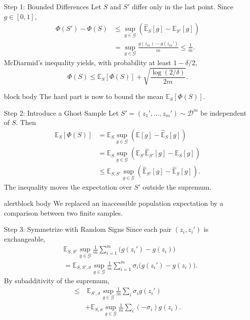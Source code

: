 \documentclass[aspectratio=169,10pt]{beamer}
\newcommand{\D}{\mathcal{D}}
\newcommand{\Gc}{\mathcal{G}}
\newcommand{\E}{\mathbb{E}}
\newcommand{\KeyBox}[1]{%
  \begin{beamercolorbox}[rounded=true,sep=0.22cm,wd=\linewidth]{block body}
    #1
  \end{beamercolorbox}%
}
\newcommand{\OrangeBox}[1]{%
  \begin{beamercolorbox}[rounded=true,sep=0.22cm,wd=\linewidth]{alertblock body}
    #1
  \end{beamercolorbox}%
}
\begin{document}
\begin{frame}[t]{Step 1: Bounded Differences}
  \vspace{0.01cm}
  Let $S$ and $S'$ differ only in the last point. Since $g\in[0,1]$,
  \begin{align*}
    \Phi(S')-\Phi(S)
    &\le \sup_{g\in\Gc}
      \left(\widehat{\E}_S[g]-\widehat{\E}_{S'}[g]\right)\\
    &=\sup_{g\in\Gc}\frac{g(z_m)-g(z_m')}{m}
    \le \frac1m.
  \end{align*}
  McDiarmid's inequality yields, with probability at least $1-\delta/2$,
  \[
    \Phi(S)
    \le \E_S[\Phi(S)]
    +\sqrt{\frac{\log(2/\delta)}{2m}}.
  \]
  \vspace{0.05cm}
  \KeyBox{The hard part is now to bound the mean $\E_S[\Phi(S)]$.}
\end{frame}

\begin{frame}[t]{Step 2: Introduce a Ghost Sample}
  \vspace{0.01cm}
  Let $S'=(z_1',\ldots,z_m')\sim\D^m$ be independent of $S$. Then
  \begin{align*}
    \E_S[\Phi(S)]
    &=\E_S\sup_{g\in\Gc}\left(\E[g]-\widehat{\E}_S[g]\right)\\
    &=\E_S\sup_{g\in\Gc}
      \left(\E_{S'}\widehat{\E}_{S'}[g]-\widehat{\E}_S[g]\right)\\
    &\le \E_{S,S'}\sup_{g\in\Gc}
      \left(\widehat{\E}_{S'}[g]-\widehat{\E}_S[g]\right).
  \end{align*}
  The inequality moves the expectation over $S'$ outside the supremum.
  \vspace{0.08cm}
  \OrangeBox{We replaced an inaccessible population expectation by a comparison between two finite samples.}
\end{frame}

\begin{frame}[t]{Step 3: Symmetrize with Random Signs}
  \vspace{0.01cm}
  {\small
  Since each pair $(z_i,z_i')$ is exchangeable,
  \begin{align*}
    &\E_{S,S'}\sup_{g\in\Gc}
    \frac1m\sum_{i=1}^m\bigl(g(z_i')-g(z_i)\bigr)\\
    &=\E_{S,S',\sigma}\sup_{g\in\Gc}
    \frac1m\sum_{i=1}^m\sigma_i\bigl(g(z_i')-g(z_i)\bigr).
  \end{align*}
  By subadditivity of the supremum,
  \begin{align*}
    \le &\ \E_{S',\sigma}\sup_{g\in\Gc}\frac1m\sum_i\sigma_i g(z_i')\\
       &+\E_{S,\sigma}\sup_{g\in\Gc}\frac1m\sum_i(-\sigma_i)g(z_i).
  \end{align*}}
\end{frame}
\end{document}
